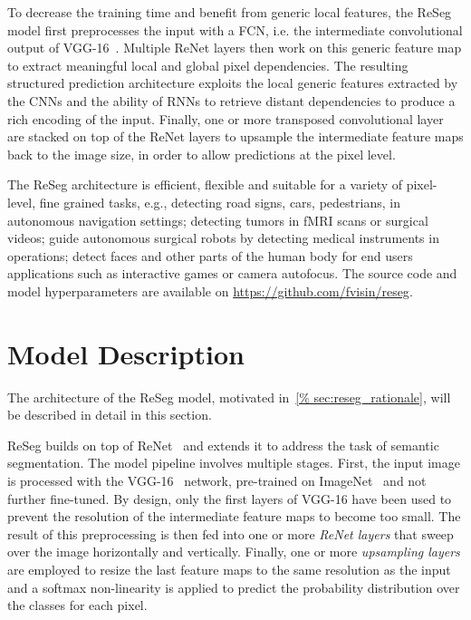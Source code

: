 To decrease the training time and benefit from generic local features, the
ReSeg model first preprocesses the input with a FCN, i.e. the intermediate
convolutional output of VGG-16~\cite{Simonyan2015}. Multiple ReNet layers then
work on this generic feature map to extract meaningful local and global pixel
dependencies.
The resulting structured prediction architecture exploits the local generic
features extracted by the CNNs and the ability of RNNs to retrieve distant
dependencies to produce a rich encoding of the input. Finally, one or more
transposed convolutional layer are stacked on top of the ReNet layers to
upsample the intermediate feature maps back to the image size, in order to
allow predictions at the pixel level.

The ReSeg architecture is efficient, flexible and suitable for a variety of
pixel-level, fine grained tasks, e.g., detecting road signs, cars, pedestrians,
in autonomous navigation settings; detecting tumors in fMRI scans or surgical
videos; guide autonomous surgical robots by detecting medical instruments in
operations; detect faces and other parts of the human body for end users
applications such as interactive games or camera autofocus.
The source code and model hyperparameters are available on
\href{https://github.com/fvisin/reseg}{https://github.com/fvisin/reseg}.


\section{Model Description}\label{sec:reseg_model}

The architecture of the ReSeg model, motivated in~\autoref{%
sec:reseg_rationale}, will be described in detail in this section.

ReSeg builds on top of ReNet~\cite{visin2015renet} and extends it to address
the task of semantic segmentation.  The model pipeline involves multiple
stages. First, the input image is processed with the VGG-16~\cite{Simonyan2015}
network, pre-trained on ImageNet~\cite{imagenet_cvpr09} and not further
fine-tuned. By design, only the first layers of VGG-16 have been used to
prevent the resolution of the intermediate feature maps to become too small.
The result of this preprocessing is then fed into one or more \emph{ReNet
layers} that sweep over the image horizontally and vertically. Finally, one or
more \emph{upsampling layers} are employed to resize the last feature maps to
the same resolution as the input and a softmax non-linearity is applied to
predict the probability distribution over the classes for each pixel.

